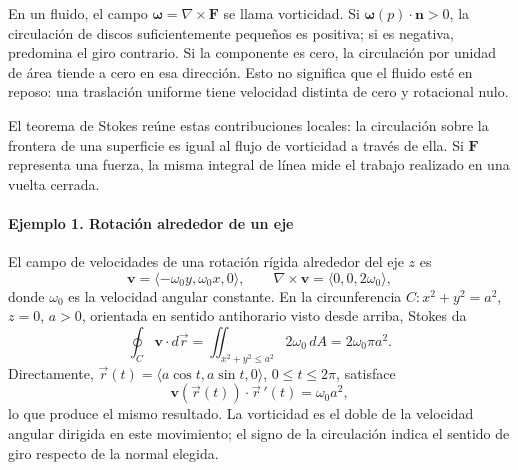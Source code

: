 \begin{center}
\begin{minipage}{.94\textwidth}
\centering
\begingroup\shorthandoff{>}
\endgroup
\end{minipage}
\end{center}

En un fluido, el campo $\boldsymbol\omega=\nabla\times\mathbf F$ se llama vorticidad. Si $\boldsymbol\omega(p)\cdot\mathbf n>0$, la circulación de discos suficientemente pequeños es positiva; si es negativa, predomina el giro contrario. Si la componente es cero, la circulación por unidad de área tiende a cero en esa dirección. Esto no significa que el fluido esté en reposo: una traslación uniforme tiene velocidad distinta de cero y rotacional nulo.

El teorema de Stokes reúne estas contribuciones locales: la circulación sobre la frontera de una superficie es igual al flujo de vorticidad a través de ella. Si $\mathbf F$ representa una fuerza, la misma integral de línea mide el trabajo realizado en una vuelta cerrada.

\paragraph{Ejemplo 1. Rotación alrededor de un eje}
El campo de velocidades de una rotación rígida alrededor del eje $z$ es
\[
\mathbf v=\langle-\omega_0 y,\omega_0 x,0\rangle,
\qquad \nabla\times\mathbf v=\langle0,0,2\omega_0\rangle,
\]
donde $\omega_0$ es la velocidad angular constante. En la circunferencia $C:x^2+y^2=a^2$, $z=0$, $a>0$, orientada en sentido antihorario visto desde arriba, Stokes da
\[
\oint_C\mathbf v\cdot d\vec r=\iint_{x^2+y^2\leq a^2}2\omega_0\,dA
=2\omega_0\pi a^2.
\]
Directamente, $\vec r(t)=\langle a\cos t,a\sin t,0\rangle$, $0\leq t\leq2\pi$, satisface
\[
\mathbf v(\vec r(t))\cdot\vec r\,'(t)=\omega_0 a^2,
\]
lo que produce el mismo resultado. La vorticidad es el doble de la velocidad angular dirigida en este movimiento; el signo de la circulación indica el sentido de giro respecto de la normal elegida.


